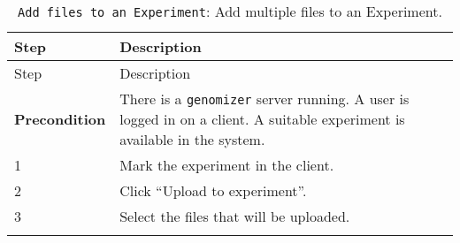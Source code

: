 \begin{longtable}[c]{@{}ll@{}}
\caption{\texttt{Add\ files\ to\ an\ Experiment}: Add multiple files to
an Experiment.}\tabularnewline
\toprule
\begin{minipage}[b]{0.31\columnwidth}\raggedright\strut
Step
\strut\end{minipage} &
\begin{minipage}[b]{0.63\columnwidth}\raggedright\strut
Description
\strut\end{minipage}\tabularnewline
\midrule
\endfirsthead
\toprule
\begin{minipage}[b]{0.31\columnwidth}\raggedright\strut
Step
\strut\end{minipage} &
\begin{minipage}[b]{0.63\columnwidth}\raggedright\strut
Description
\strut\end{minipage}\tabularnewline
\midrule
\endhead
\begin{minipage}[t]{0.31\columnwidth}\raggedright\strut
\textbf{Precondition}
\strut\end{minipage} &
\begin{minipage}[t]{0.63\columnwidth}\raggedright\strut
There is a \texttt{genomizer} server running. A user is logged in on a
client. A suitable experiment is available in the system.
\strut\end{minipage}\tabularnewline
\begin{minipage}[t]{0.31\columnwidth}\raggedright\strut
1
\strut\end{minipage} &
\begin{minipage}[t]{0.63\columnwidth}\raggedright\strut
Mark the experiment in the client.
\strut\end{minipage}\tabularnewline
\begin{minipage}[t]{0.31\columnwidth}\raggedright\strut
2
\strut\end{minipage} &
\begin{minipage}[t]{0.63\columnwidth}\raggedright\strut
Click ``Upload to experiment''.
\strut\end{minipage}\tabularnewline
\begin{minipage}[t]{0.31\columnwidth}\raggedright\strut
3
\strut\end{minipage} &
\begin{minipage}[t]{0.63\columnwidth}\raggedright\strut
Select the files that will be uploaded.
\strut\end{minipage}\tabularnewline
\begin{minipage}[t]{0.31\columnwidth}\raggedright\strut

\end{minipage}
\end{longtable}
